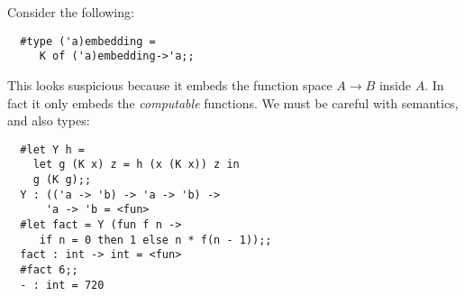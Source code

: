 \begin{slide*}


\vspace*{0.5cm}

Consider the following:

\begin{black}\begin{verbatim}
  #type ('a)embedding =
     K of ('a)embedding->'a;;
\end{verbatim}\end{black}

This looks suspicious because it embeds the function space {\red $A \to B$}
inside {\red $A$}. In fact it only embeds the {\em computable} functions.
We must be careful with semantics, and also types:
\begin{black}\begin{verbatim}
  #let Y h =
    let g (K x) z = h (x (K x)) z in
    g (K g);;
  Y : (('a -> 'b) -> 'a -> 'b) ->
      'a -> 'b = <fun>
  #let fact = Y (fun f n ->
     if n = 0 then 1 else n * f(n - 1));;
  fact : int -> int = <fun>
  #fact 6;;
  - : int = 720
\end{verbatim}\end{black}

\end{slide*}






